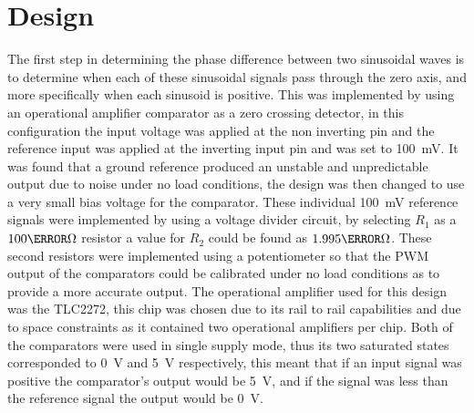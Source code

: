 \section{Design} \label{sec:design_phasetransducer}
The first step in determining the phase difference between two sinusoidal waves is to determine when each of these sinusoidal signals pass through the zero axis, and more specifically when each sinusoid is positive. This was implemented by using an operational amplifier comparator as a zero crossing detector, in this configuration the input voltage was applied at the non inverting pin and the reference input was applied at the inverting input pin and was set to \SI{100}{\milli \volt}. It was found that a ground reference produced an unstable and unpredictable output due to noise under no load conditions, the design was then changed to use a very small bias voltage for the comparator. These individual \SI{100}{\milli \volt} reference signals were implemented by using a voltage divider circuit, by selecting $R_1$ as a $100\kilo \Omega$ resistor a value for $R_2$ could be found as $1.995\kilo \Omega$. These second resistors were implemented using a potentiometer so that the PWM output of the comparators could be calibrated under no load conditions as to provide a more accurate output. The operational amplifier used for this design was the TLC2272, this chip was chosen due to its rail to rail capabilities and due to space constraints as it contained two operational amplifiers per chip. Both of the comparators were used in single supply mode, thus its two saturated states corresponded to \SI{0}{\volt} and \SI{5}{\volt} respectively, this meant that if an input signal was positive the comparator's output would be \SI{5}{\volt}, and if the signal was less than the reference signal the output would be \SI{0}{\volt}. \vspace{4mm} \newline

